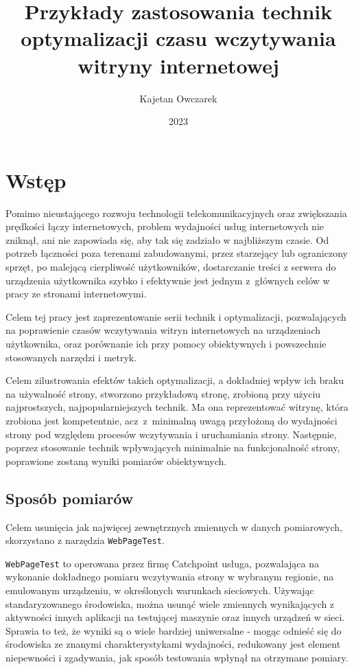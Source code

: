 \documentclass[licencjacka]{pracadypl}
\author{Kajetan Owczarek}
\title{Przykłady zastosowania technik optymalizacji czasu wczytywania witryny internetowej}
\date{2023}
\begin{document}
\maketitle
\tableofcontents
\newpage



\chapter{Wstęp}

Pomimo nieustającego rozwoju technologii telekomunikacyjnych oraz zwiększania prędkości łączy internetowych, problem wydajności usług internetowych nie zniknął, ani nie zapowiada się, aby tak się zadziało w najbliższym czasie. Od potrzeb łączności poza terenami zabudowanymi, przez starzejący lub ograniczony sprzęt, po malejącą cierpliwość użytkowników, dostarczanie treści z serwera do urządzenia użytkownika szybko i efektywnie jest jednym z~głównych celów w pracy ze stronami internetowymi.

Celem tej pracy jest zaprezentowanie serii technik i optymalizacji, pozwalających na poprawienie czasów wczytywania witryn internetowych na urządzeniach użytkownika, oraz porównanie ich przy pomocy obiektywnych i powszechnie stosowanych narzędzi i metryk.

Celem zilustrowania efektów takich optymalizacji, a dokładniej wpływ ich braku na używalność strony, stworzono przykładową stronę, zrobioną przy użyciu najprostszych, najpopularniejszych technik. Ma ona reprezentować witrynę, która zrobiona jest kompetentnie, acz~z~minimalną uwagą przyłożoną do wydajności strony pod względem procesów wczytywania i uruchamiania strony. Następnie, poprzez stosowanie technik wpływających minimalnie na funkcjonalność strony, poprawione zostaną wyniki pomiarów obiektywnych.

\section{Sposób pomiarów}
Celem usunięcia jak najwięcej zewnętrznych zmiennych w danych pomiarowych,
skorzystano z narzędzia \texttt{WebPageTest}.

\texttt{WebPageTest} to operowana przez firmę Catchpoint usługa, pozwalająca na wykonanie dokładnego pomiaru wczytywania strony w wybranym regionie, na emulowanym urządzeniu, w określonych warunkach sieciowych. Używając standaryzowanego środowiska, można usunąć wiele zmiennych wynikających z aktywności innych aplikacji na testującej maszynie oraz innych urządzeń w sieci. Sprawia to też, że wyniki są o wiele bardziej uniwersalne - mogąc odnieść się do środowiska ze znanymi charakterystykami wydajności, redukowany jest element niepewności i zgadywania, jak sposób testowania wpłynął na otrzymane pomiary. 
\end{document}

